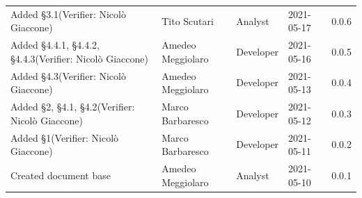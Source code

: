 \documentclass[a4paper]{article}
\begin{document}
\begin{center}
\begin{table}[h!]
\begin{tabular}{p{150px} p{90px} p{80px} p{60px} p{45px}}
            Added \S{3.1}\newline(Verifier: Nicolò Giaccone)                              & Tito Scutari      & Analyst       & 2021-05-17    & 0.0.6            \\
            Added \S{4.4.1}, \S{4.4.2}, \S{4.4.3}\newline(Verifier: Nicolò Giaccone)      & Amedeo Meggiolaro & Developer     & 2021-05-16    & 0.0.5            \\
            Added \S{4.3}\newline(Verifier: Nicolò Giaccone)                              & Amedeo Meggiolaro & Developer     & 2021-05-13    & 0.0.4            \\
            Added \S{2}, \S{4.1}, \S{4.2}\newline(Verifier: Nicolò Giaccone)              & Marco Barbaresco  & Developer     & 2021-05-12    & 0.0.3            \\
            Added \S{1}\newline(Verifier: Nicolò Giaccone)                                & Marco Barbaresco  & Developer     & 2021-05-11    & 0.0.2            \\
            Created document base                                                         & Amedeo Meggiolaro & Analyst       & 2021-05-10    & 0.0.1            \\
        \end{tabular}
    \end{table}
\end{center}

\newpage
\tableofcontents
\newpage
\newpage
\listoffigures
\newpage
\newpage
\listoftables
\newpage






\end{document}
